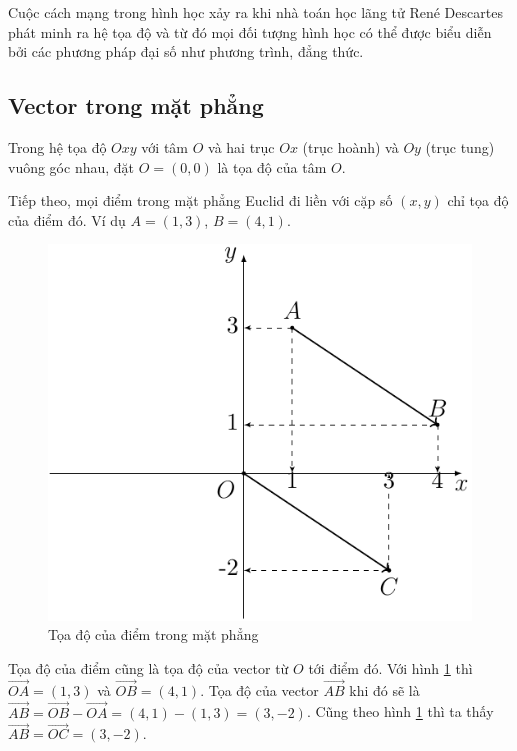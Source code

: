 Cuộc cách mạng trong hình học xảy ra khi nhà toán học lãng tử René Descartes phát minh ra hệ tọa độ và từ đó mọi đối tượng hình học có thể được biểu diễn bởi các phương pháp đại số như phương trình, đẳng thức.

\subsection{Vector trong mặt phẳng}

Trong hệ tọa độ $Oxy$ với tâm $O$ và hai trục $Ox$ (trục hoành) và $Oy$ (trục tung) vuông góc nhau, đặt $O = (0, 0)$ là tọa độ của tâm $O$.

Tiếp theo, mọi điểm trong mặt phẳng Euclid đi liền với cặp số $(x, y)$ chỉ tọa độ của điểm đó. Ví dụ $A = (1, 3)$, $B = (4, 1)$.

\begin{figure}[ht]
	\centering
	\includegraphics[page=1]{analytic_geometry/oxy1.pdf}
	\caption{Tọa độ của điểm trong mặt phẳng}
	\label{oxy1}
\end{figure}

Tọa độ của điểm cũng là tọa độ của vector từ $O$ tới điểm đó. Với hình \ref{oxy1} thì $\overrightarrow{OA} = (1, 3)$ và $\overrightarrow{OB} = (4, 1)$. Tọa độ của vector $\overrightarrow{AB}$ khi đó sẽ là $\overrightarrow{AB} = \overrightarrow{OB} - \overrightarrow{OA} = (4, 1) - (1, 3) = (3, -2)$. Cũng theo hình \ref{oxy1} thì ta thấy $\overrightarrow{AB} = \overrightarrow{OC} = (3, -2)$. 

